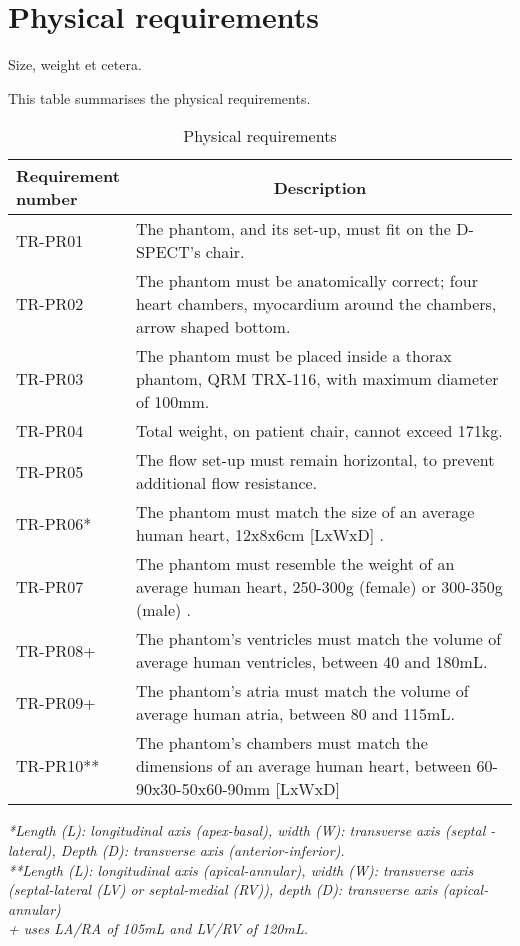 \section{Physical requirements}
Size, weight et cetera.
\begin{table} [H]
\caption{Physical requirements}
\label{tab:physrec}
This table summarises the physical requirements.
\begin{tabular}{l|p{120mm}|}
	\makecell[l]{\textbf{Requirement} \\ \textbf{number}} & \multicolumn{1}{c}{\textbf{Description}}\\
	\hline
	TR-PR01 & The phantom, and its set-up, must fit on the D-SPECT's chair. \\
	TR-PR02 & The phantom must be anatomically correct; four heart chambers, myocardium around the chambers, arrow shaped bottom. \\
	TR-PR03 & The phantom must be placed inside a thorax phantom, QRM TRX-116, with maximum diameter of 100mm. \\
	TR-PR04 & Total weight, on patient chair, cannot exceed 171kg. \\
	TR-PR05 & The flow set-up must remain horizontal, to prevent additional flow resistance. \\
	TR-PR06* & The phantom must match the size of an average human heart, 12x8x6cm [LxWxD] \citep{openstax2013anatomy}. \\
	TR-PR07 & The phantom must resemble the weight of an average human heart, 250-300g (female) or 300-350g (male) \citep{openstax2013anatomy}. \\
	TR-PR08+ & The phantom's ventricles must match the volume of average human ventricles, between 40 and 180mL. \\
	TR-PR09+ & The phantom's atria must match the volume of average human atria, between 80 and 115mL. \\
	TR-PR10** & The phantom's chambers must match the dimensions of an average human heart, between 60-90x30-50x60-90mm [LxWxD] \\
	\cline{2-2}
\end{tabular}
\raggedright
\textit{*Length (L): longitudinal axis (apex-basal), width (W): transverse axis (septal - lateral), Depth (D):  transverse axis (anterior-inferior).} \\
\textit{**Length (L): longitudinal axis (apical-annular), width (W): transverse axis (septal-lateral (LV) or septal-medial (RV)), depth (D): transverse axis (apical-annular)} \\
\textit{+\cite{chiribiri2013perfusion} uses LA/RA of 105mL and LV/RV of 120mL.}
\end{table}

